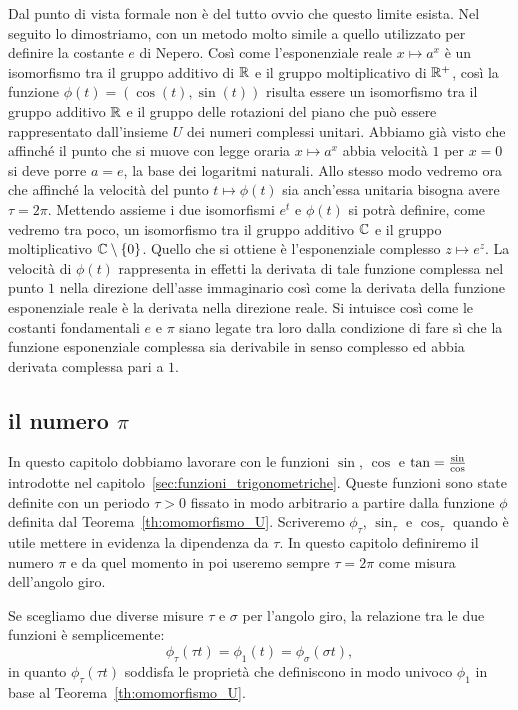 Dal punto di vista formale non è del tutto ovvio che questo limite esista.
Nel seguito lo dimostriamo, con un metodo molto simile a quello utilizzato 
per definire la costante $e$ di Nepero.
Così come l'esponenziale reale $x\mapsto a^x$ 
è un isomorfismo tra il gruppo additivo di ${\mathbb R}$ e il gruppo moltiplicativo 
di ${\mathbb R}^+$, così la funzione $\phi(t) = (\cos(t), \sin(t))$ 
risulta essere un isomorfismo 
tra il gruppo additivo ${\mathbb R}$ e il gruppo delle rotazioni del piano che può essere 
rappresentato dall'insieme $U$ dei numeri complessi unitari.
Abbiamo già visto che affinché il punto che si muove con legge 
oraria $x\mapsto a^x$ abbia velocità $1$ per $x=0$ 
si deve porre $a=e$, la base dei logaritmi naturali.
Allo stesso modo vedremo ora che affinché la velocità 
del punto $t\mapsto \phi(t)$ 
sia anch'essa unitaria bisogna avere $\tau = 2\pi$.
Mettendo assieme i due isomorfismi $e^t$ e $\phi(t)$ si potrà definire,
come vedremo tra poco, un isomorfismo tra il gruppo additivo ${\mathbb C}$ 
e il gruppo moltiplicativo ${\mathbb C}\setminus{\left\{ 0 \right\}}$.
Quello che si ottiene è l'esponenziale complesso $z\mapsto e^z$. 
La velocità di $\phi(t)$ rappresenta in effetti la derivata di tale funzione 
complessa nel punto $1$ nella direzione dell'asse immaginario 
così come la derivata della funzione esponenziale reale è la derivata 
nella direzione reale. 
Si intuisce così come le costanti fondamentali $e$ e $\pi$ siano legate 
tra loro dalla condizione di fare sì che la funzione esponenziale complessa 
sia derivabile in senso complesso ed abbia derivata complessa pari a $1$.

\subsection{il numero $\pi$}

In questo capitolo dobbiamo lavorare con le funzioni 
$\sin$, $\cos$ e $\operatorname{tan}=\frac{\sin }{\cos}$ introdotte 
nel capitolo~\ref{sec:funzioni_trigonometriche}. 
Queste funzioni sono state definite con un periodo $\tau>0$
fissato in modo arbitrario a partire dalla funzione $\phi$ definita 
dal Teorema~\ref{th:omomorfismo_U}. 
Scriveremo $\phi_\tau$,
$\sin_\tau$ e $\cos_\tau$ quando è utile mettere in evidenza 
la dipendenza da $\tau$. 
In questo capitolo definiremo il numero $\pi$ e da quel momento 
in poi useremo sempre $\tau=2\pi$ come misura dell'angolo giro.

Se scegliamo due diverse misure $\tau$ e $\sigma$ per l'angolo giro, 
la relazione tra le due funzioni è semplicemente:
\begin{equation}\label{cambio_angolo}
  \phi_\tau (\tau t) = \phi_1(t) = \phi_\sigma(\sigma t), 
\end{equation}
in quanto $\phi_\tau(\tau t)$ soddisfa le proprietà che 
definiscono in modo univoco $\phi_1$ in base al Teorema~\ref{th:omomorfismo_U}.

